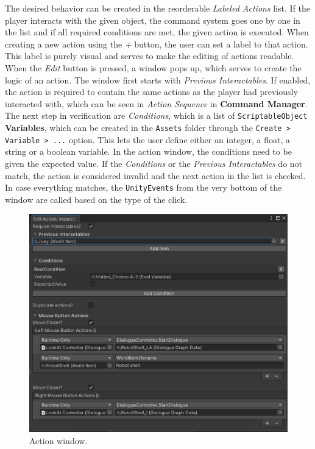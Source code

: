 The desired behavior can be created in the reorderable \textit{Labeled Actions} list. If the player interacts with the given object, the command system goes one by one in the list and if all required conditions are met, the given action is executed. When creating a new action using the \textit{+} button, the user can set a label to that action. This label is purely visual and serves to make the editing of actions readable. When the \textit{Edit} button is pressed, a window pops up, which serves to create the logic of an action. The window first starts with \textit{Previous Interactables}. If enabled, the action is required to contain the same actions as the player had previously interacted with, which can be seen in \textit{Action Sequence} in \textbf{Command Manager}. The next step in verification are \textit{Conditions}, which is a list of \verb|ScriptableObject| \textbf{Variables}, which can be created in the \verb|Assets| folder through the \verb|Create > Variable > ...| option. This lets the user define either an integer, a float, a string or a boolean variable. In the action window, the conditions need to be given the expected value. If the \textit{Conditions} or the \textit{Previous Interactables} do not match, the action is considered invalid and the next action in the list is checked. In case everything matches, the \verb|UnityEvents| from the very bottom of the window are called based on the type of the click.

\begin{figure}[H]
\centering
\includegraphics[width=.8\linewidth]{img/User doc/action_window.png}
\caption{Action window.}
\label{fig:BaSS-manual}
\end{figure}


